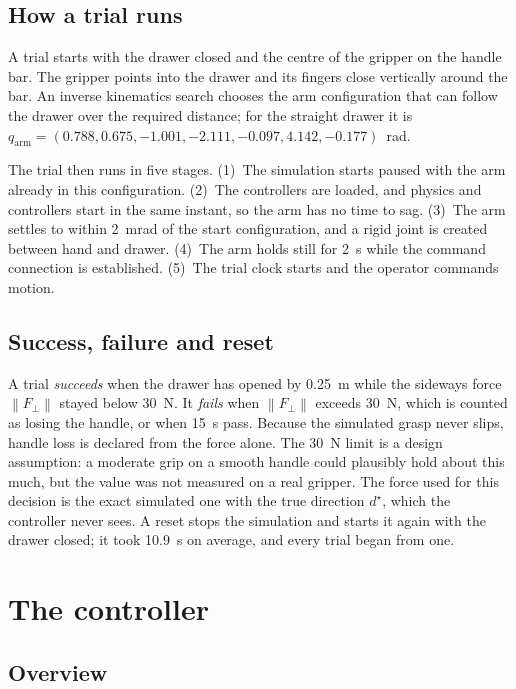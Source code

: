 \documentclass[11pt,a4paper]{article}
\newcommand{\norm}[1]{\left\lVert #1 \right\rVert}
\newcommand{\Fperp}{F_{\perp}}
\newcommand{\dstar}{d^{\star}}
\begin{document}
\subsection{How a trial runs}

A trial starts with the drawer closed and the centre of the gripper on the handle bar. The gripper
points into the drawer and its fingers close vertically around the bar. An inverse kinematics
search chooses the arm configuration that can follow the drawer over the required distance; for
the straight drawer it is $q_{\mathrm{arm}} = (0.788, 0.675, -1.001, -2.111, -0.097, 4.142,
-0.177)$~rad.

The trial then runs in five stages. (1)~The simulation starts paused with the arm already in this
configuration. (2)~The controllers are loaded, and physics and controllers start in the same
instant, so the arm has no time to sag. (3)~The arm settles to within 2~mrad of the start
configuration, and a rigid joint is created between hand and drawer. (4)~The arm holds still for
2~s while the command connection is established. (5)~The trial clock starts and the operator
commands motion.

\subsection{Success, failure and reset}

A trial \emph{succeeds} when the drawer has opened by 0.25~m while the sideways force
$\norm{\Fperp}$ stayed below 30~N. It \emph{fails} when $\norm{\Fperp}$ exceeds 30~N, which is
counted as losing the handle, or when 15~s pass. Because the simulated grasp never slips, handle
loss is declared from the force alone. The 30~N limit is a design assumption: a moderate grip on
a smooth handle could plausibly hold about this much, but the value was not measured on a real
gripper. The force used for this decision is the exact simulated one with the true direction
$\dstar$, which the controller never sees. A reset stops the simulation and starts it again with
the drawer closed; it took 10.9~s on average, and every trial began from one.

\section{The controller}\label{sec:controller}

\subsection{Overview}
\end{document}
